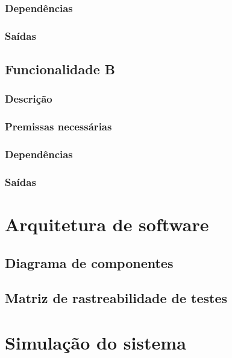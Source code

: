 \subsubsection{Dependências}
\label{ssub:depA}

\subsubsection{Saídas}
\label{ssub:saidaA}



\subsection{Funcionalidade B}
\label{sub:funcB}

\subsubsection{Descrição} %
\label{ssub:descB}

\subsubsection{Premissas necessárias}
\label{ssub:premB}

\subsubsection{Dependências}
\label{ssub:depB}

\subsubsection{Saídas}
\label{ssub:saidaB}


\section{Arquitetura de software}
\label{sec:arqs}


\subsection{Diagrama de componentes}
\label{sub:diagcomp}


\subsection{Matriz de rastreabilidade de testes}
\label{sub:matrast}


\section{Simulação do sistema}
\label{sec:simul}






